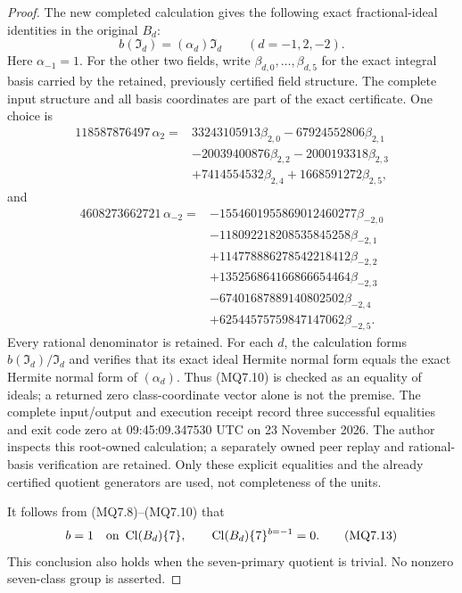 \begin{proof}
The new completed calculation gives the following exact
fractional-ideal identities in the original $B_d$:
\[
                       b(\mathfrak I_d)=(\alpha_d)\mathfrak I_d
                      \qquad(d=-1,2,-2).
 \tag{MQ7.10}
\]
Here $\alpha_{-1}=1$.  For the other two fields, write
$\beta_{d,0},\ldots,\beta_{d,5}$ for the exact integral
basis carried by the retained, previously certified field
structure.  The complete input structure and all basis
coordinates are part of the exact certificate.  One choice is
\[
 \begin{split}
 118587876497\,\alpha_2={}&
 33243105913\beta_{2,0}-67924552806\beta_{2,1}\\
 &-20039400876\beta_{2,2}-2000193318\beta_{2,3}\\
 &+7414554532\beta_{2,4}+1668591272\beta_{2,5},
 \end{split}
 \tag{MQ7.11}
\]
and
\[
 \begin{split}
 4608273662721\,\alpha_{-2}={}&
 -1554601955869012460277\beta_{-2,0}\\
 &-118092218208535845258\beta_{-2,1}\\
 &+114778886278542218412\beta_{-2,2}\\
 &+135256864166866654464\beta_{-2,3}\\
 &-67401687889140802502\beta_{-2,4}\\
 &+62544575759847147062\beta_{-2,5}.
 \end{split}
 \tag{MQ7.12}
\]
Every rational denominator is retained.  For each $d$, the
calculation forms $b(\mathfrak I_d)/\mathfrak I_d$ and
verifies that its exact ideal Hermite normal form equals
the exact Hermite normal form of $(\alpha_d)$.
Thus (MQ7.10) is checked as an equality of ideals; a returned
zero class-coordinate vector alone is not the premise.
The complete input/output and execution receipt record three
successful equalities and exit code zero at
09:45:09.347530 UTC on 23 November 2026.
The author inspects this root-owned calculation; a separately
owned peer replay and rational-basis verification are retained.
Only these explicit equalities and the already certified
quotient generators are used, not completeness of the units.

It follows from (MQ7.8)--(MQ7.10) that
\[
             b=1\quad\hbox{on }\operatorname{Cl}(B_d)\{7\},
             \qquad\operatorname{Cl}(B_d)\{7\}^{b=-1}=0.
 \tag{MQ7.13}
\]
This conclusion also holds when the seven-primary quotient
is trivial.  No nonzero seven-class group is asserted.


\end{proof}
